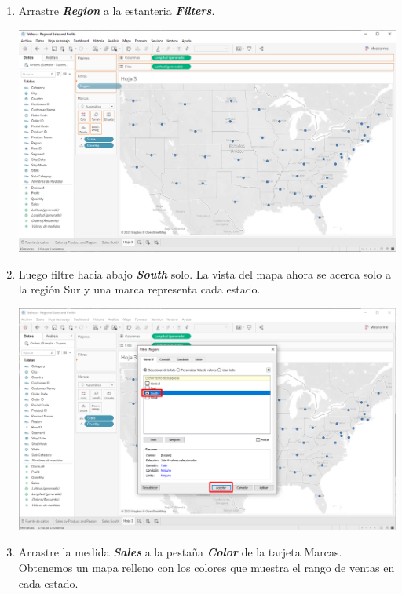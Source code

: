 \documentclass[12pt,letterpaper]{article}
\begin{document}
\begin{enumerate}
\begin{center}
        \end{center}
        \item Arrastre \textit{\textbf{Region}} a la estanteria \textit{\textbf{Filters}}.
        \begin{center}
            \includegraphics[width=15cm]{./img/img34.png}
        \end{center}
        \item Luego filtre hacia abajo \textit{\textbf{South}} solo. La vista del mapa ahora se acerca solo a la región Sur y una marca representa cada estado.
        \begin{center}
            \includegraphics[width=15cm]{./img/img35.png}
        \end{center}
        \item Arrastre la medida \textit{\textbf{Sales}} a la pestaña \textit{\textbf{Color}} de la tarjeta Marcas. Obtenemos un mapa relleno con los colores que muestra el rango de ventas en cada estado.
        \begin{center}

\end{center}
\end{enumerate}
\end{document}
